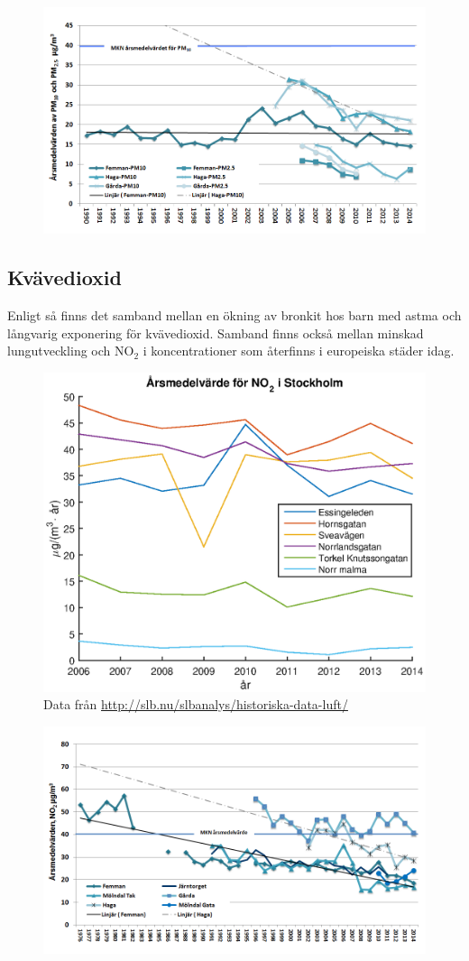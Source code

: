 \begin{figure}
	\centering
	\includegraphics[width=.8\textwidth]{Bilder/pm10gbg}
	\caption{\cite{gbg}}
	\label{fig:pm10gbg}
\end{figure}
\subsection{Kvävedioxid}
Enligt \cite{whoAir} så finns det samband mellan en ökning av bronkit hos barn med astma och långvarig exponering för kvävedioxid. Samband finns också mellan minskad lungutveckling och NO$_2$ i koncentrationer som återfinns i europeiska städer idag.
\begin{figure}
	\centering
	\includegraphics[width=.8\textwidth]{Bilder/NO2sth}
	\caption{Data från \url{http://slb.nu/slbanalys/historiska-data-luft/}}
	\label{fig:NO2sth}
\end{figure}

\begin{figure}
	\centering
	\includegraphics[width=.8\textwidth]{Bilder/NO2gbg}
	\caption{\cite{gbg}}
	\label{fig:NO2gbg}
\end{figure}
